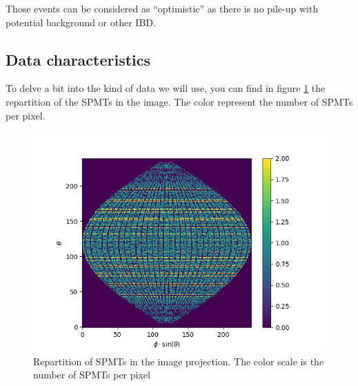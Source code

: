 \documentclass[../main.tex]{subfiles}
\begin{document}
Those events can be considered as ``optimistic'' as there is no pile-up with potential background or other IBD.

\subsection{Data characteristics}

To delve a bit into the kind of data we will use, you can find in figure \ref{fig:jcnn:pmt_rep} the repartition of the SPMTs in the image. The color represent the number of SPMTs per pixel.

\begin{figure}[ht]
  \centering
  \includegraphics[width=\textwidth]{images/jcnn/pmt_repartition.png}
  \caption{Repartition of SPMTs in the image projection. The color scale is the number of SPMTs per pixel}
  \label{fig:jcnn:pmt_rep}
\end{figure}
\end{document}
